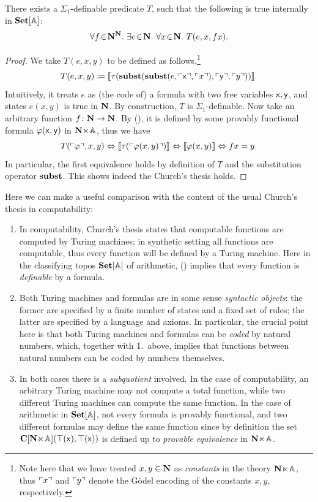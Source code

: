 \begin{theorem}\label{thm:church}
  There exists a $\Sigma_1$-definable predicate $T$, such that the following is true internally in $\mathbf{Set}[\mathbb{A}]$:
  \[ \forall f\!\in\!\mathbf N^\mathbf N.\  \exists e\!\in\!\mathbf N.\  \forall x\!\in\!\mathbf N.\  T(e,x,fx). \]
\end{theorem}
\begin{proof}
  We take $T(e,x,y)$ to be defined as follows,\footnote{Note here that we have treated $x,y\in\mathbf N$ as \emph{constants} in the theory $\mathbf N\hspace{-.4ex}\ltimes\hspace{-.4ex}\mathbb{A}$, thus $\ulcorner x \urcorner$ and $\ulcorner y \urcorner$ denote the G\"odel encoding of the constants $x,y$, respectively.}
  \[ T(e,x,y) \coloneq \llbracket\tau(\mathbf{subst}(\mathbf{subst}(e,\ulcorner \mathsf{x} \urcorner,\ulcorner x \urcorner),\ulcorner \mathsf{y} \urcorner,\ulcorner y \urcorner))\rrbracket. \]
  Intuitively, it treats $e$ as (the code of) a formula with two free variables $\mathsf{x},\mathsf{y}$, and states $e(x,y)$ is true in $\mathbf N$. By construction, $T$ is $\Sigma_1$-definable. Now take an arbitrary function $f \colon \mathbf N \to \mathbf N$. By (\AxiomSQCA), it is defined by some provably functional formula $\varphi(\mathsf{x},\mathsf{y})$ in $\mathbf N\hspace{-.4ex}\ltimes\hspace{-.4ex}\mathbb{A}$, thus we have
  \[ T(\ulcorner \varphi \urcorner,x,y) \Leftrightarrow \llbracket\tau(\ulcorner \varphi(x,y) \urcorner)\rrbracket \Leftrightarrow \llbracket\varphi(x,y)\rrbracket \Leftrightarrow fx = y. \]
  In particular, the first equivalence holds by definition of $T$ and the substitution operator $\mathbf{subst}$. This shows indeed the Church's thesis holds.
\end{proof}

\begin{remark}
  Here we can make a useful comparison with the content of the usual Church's thesis in computability: 
  \begin{enumerate}
    \item In computability, Church's thesis states that computable functions are computed by Turing machines; in synthetic setting all functions are computable, thus every function will be defined by a Turing machine. Here in the classifying topos $\mathbf{Set}[\mathbb{A}]$ of arithmetic, (\AxiomSQCA) implies that every function is \emph{definable} by a formula.
    \item Both Turing machines and formulas are in some sense \emph{syntactic objects}: the former are specified by a finite number of states and a fixed set of rules; the latter are specified by a language and axioms. In particular, the crucial point here is that both Turing machines and formulas can be \emph{coded} by natural numbers, which, together with 1.\ above, implies that functions between natural numbers can be coded by numbers themselves.
    \item In both cases there is a \emph{subquotient} involved. In the case of computability, an arbitrary Turing machine may not compute a total function, while two different Turing machines can compute the same function. In the case of arithmetic in $\mathbf{Set}[\mathbb{A}]$, not every formula is provably functional, and two different formulas may define the same function since by definition the set $\mathbf{C}[\mathbf N\hspace{-.4ex}\ltimes\hspace{-.4ex}\mathbb{A}](\top(\mathsf{x}),\top(\mathsf{x}))$ is defined up to \emph{provable equivalence} in $\mathbf N\hspace{-.4ex}\ltimes\hspace{-.4ex}\mathbb{A}$.
  \end{enumerate}
\end{remark}

